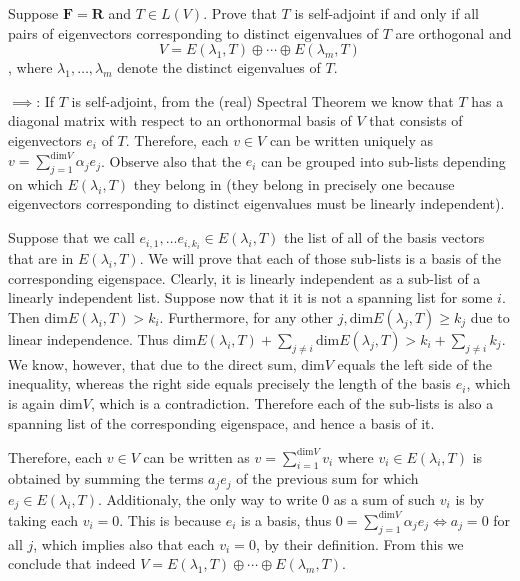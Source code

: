 \begin{exercise}{5}
     Suppose $\mathbf{F} = \mathbf{R}$ and $T \in L(V)$. Prove that $T$ is self-adjoint if and only if all pairs of eigenvectors corresponding to distinct eigenvalues of $T$ are orthogonal and 
    $$V = E(\lambda_1, T) \oplus \cdots \oplus E(\lambda_m, T)$$,
    where $\lambda_1, \ldots, \lambda_m$ denote the distinct eigenvalues of $T$.  
\end{exercise}
\begin{solution}

    $\implies$: If $T$ is self-adjoint, from the (real) Spectral Theorem we know that $T$ has a diagonal matrix with respect to an orthonormal basis of $V$ that consists of eigenvectors $e_i$ of $T$. Therefore, each $v \in V$ can be written uniquely as $v = \sum_{j=1}^{\text{dim}V}\alpha_je_j$. Observe also that the $e_i$ can be grouped into sub-lists depending on which $E(\lambda_i, T)$ they belong in (they belong in precisely one because eigenvectors corresponding to distinct eigenvalues must be linearly independent). 
    
    Suppose that we call $e_{i, 1}, \ldots e_{i, k_i} \in E(\lambda_i, T)$ the list of all of the basis vectors that are in $E(\lambda_i, T)$. We will prove that each of those sub-lists is a basis of the corresponding eigenspace. Clearly, it is linearly independent as a sub-list of a linearly independent list. Suppose now that it it is not a spanning list for some $i$. Then $\text{dim} E(\lambda_i, T) > k_i$. Furthermore, for any other $j, \text{dim} E(\lambda_j, T)\geq k_j$ due to linear independence. Thus $\text{dim} E(\lambda_i, T) + \sum_{j \neq i} \text{dim} E(\lambda_j, T) > k_i + \sum_{j \neq i} k_j$. We know, however, that due to the direct sum, $\text{dim} V$ equals the left side of the inequality, whereas the right side equals precisely the length of the basis $e_i$, which is again $\text{dim} V$, which is a contradiction. Therefore each of the sub-lists is also a spanning list of the corresponding eigenspace, and hence a basis of it.
    
    Therefore, each $v \in V$ can be written as $v = \sum_{i=1}^{\text{dim}V}v_i$ where $v_i \in E(\lambda_i, T)$ is obtained by summing the terms $a_je_j$ of the previous sum for which $e_j \in E(\lambda_i, T)$. Additionaly, the only way to write $0$ as a sum of such $v_i$ is by taking each $v_i = 0$. This is because $e_i$ is a basis, thus $0 = \sum_{j=1}^{\text{dim}V}\alpha_je_j \iff a_j = 0$ for all $j$, which implies also that each $v_i = 0$, by their definition. From this we conclude that indeed $V = E(\lambda_1, T) \oplus \cdots \oplus E(\lambda_m, T)$.


\end{solution}
